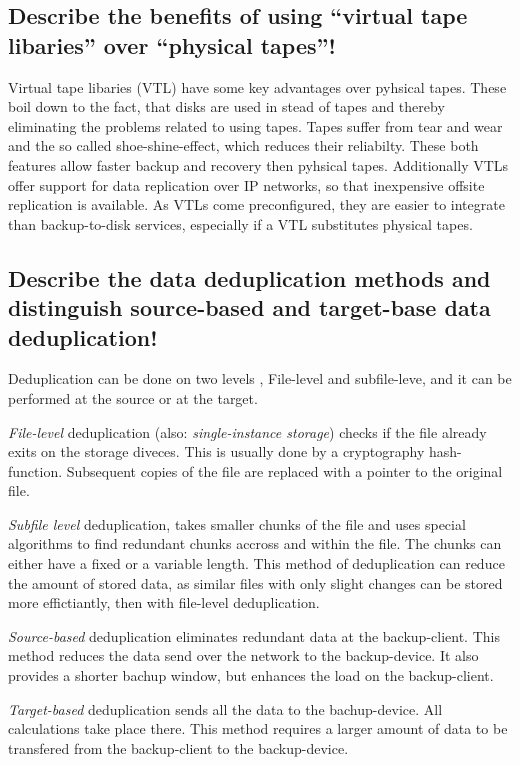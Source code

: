 \documentclass{article}
\begin{document}
\subsection{Describe the benefits of using ``virtual tape libaries'' over ``physical tapes''!}
	Virtual tape libaries (VTL) have some key advantages over pyhsical tapes.
	These boil down to the fact,
	that disks are used in stead of tapes
	and thereby eliminating the problems related to using tapes.
	Tapes suffer from tear and wear and the so called shoe-shine-effect,
	which reduces their reliabilty.
	These both features allow faster backup and recovery
	then pyhsical tapes.
	Additionally VTLs offer support for data replication over IP networks,
	so that inexpensive offsite replication is available.
	As VTLs come preconfigured,
	they are easier to integrate than backup-to-disk services,
	especially if a VTL substitutes physical tapes.

\subsection{Describe the data deduplication methods and distinguish source-based and target-base data deduplication!}
	Deduplication can be done on two levels , File-level and subfile-leve,
	and it can be performed at the source or at the target.

	\emph{File-level} deduplication (also: \textsl{single-instance storage}) 
	checks if the file already exits on the storage diveces.
	This is usually done by a cryptography hash-function.
	Subsequent copies of the file are replaced with a pointer to the original file.

	\emph{Subfile level} deduplication,
	takes smaller chunks of the file
	and uses special algorithms to find redundant chunks accross and within the file.
	The chunks can either have a fixed or a variable length.
	This method of deduplication can reduce the amount of stored data,
	as similar files with only slight changes can be stored more effictiantly,
	then with file-level deduplication.

	\emph{Source-based} deduplication eliminates redundant data at the backup-client.
	This method reduces the data send over the network to the backup-device.
	It also provides a shorter bachup window,
	but enhances the load on the backup-client.

	\emph{Target-based} deduplication sends all the data to the bachup-device.
	All calculations take place there.
	This method requires a larger amount of data to be transfered from
	the backup-client to the backup-device.
\end{document}
